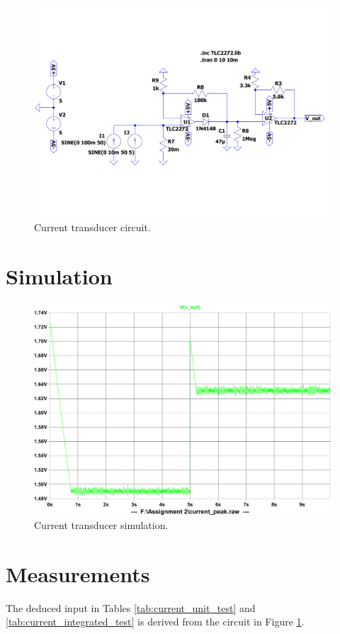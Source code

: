 \begin{figure}
        \centering
         \includegraphics[width=1\linewidth]{./Figures/current_circuit.pdf}
		    \caption{Current transducer circuit.} \label{fig:current_circuit}
 \end{figure}

\section{Simulation} \label{sec:simulation_current}

\begin{figure}
        \centering
         \includegraphics[width=0.75\linewidth]{./Figures/current_transducer_simulation.pdf}
		    \caption{Current transducer simulation.} \label{fig:current_simulate}
 \end{figure}
 
 
\section{Measurements} \label{sec:measurements_current}
The deduced input in Tables \ref{tab:current_unit_test} and \ref{tab:current_integrated_test} is derived from the circuit in Figure \ref{fig:current_circuit}.


